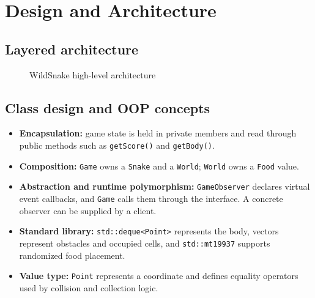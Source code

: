 \documentclass[12pt,a4paper]{report}
\begin{document}
\chapter{Design and Architecture}
\section{Layered architecture}
\begin{figure}[H]
\centering
{}
\caption{WildSnake high-level architecture}
\label{fig:architecture}
\end{figure}

\section{Class design and OOP concepts}
\begin{itemize}[leftmargin=*]
  \item \textbf{Encapsulation:} game state is held in private members and read
        through public methods such as \texttt{getScore()} and \texttt{getBody()}.
  \item \textbf{Composition:} \texttt{Game} owns a \texttt{Snake} and a
        \texttt{World}; \texttt{World} owns a \texttt{Food} value.
  \item \textbf{Abstraction and runtime polymorphism:} \texttt{GameObserver}
        declares virtual event callbacks, and \texttt{Game} calls them through
        the interface. A concrete observer can be supplied by a client.
  \item \textbf{Standard library:} \texttt{std::deque<Point>} represents the
        body, vectors represent obstacles and occupied cells, and
        \texttt{std::mt19937} supports randomized food placement.
  \item \textbf{Value type:} \texttt{Point} represents a coordinate and defines
        equality operators used by collision and collection logic.
\end{itemize}
\end{document}
